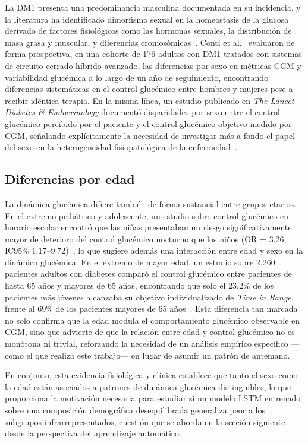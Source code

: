 La DM1 presenta una predominancia masculina documentada en su incidencia, y la literatura ha identificado dimorfismo sexual en la homeostasis de la glucosa derivado de factores fisiológicos como las hormonas sexuales, la distribución de masa grasa y muscular, y diferencias cromosómicas~\cite{mauvaisjarvis2023sexdiff}. Conti et al.~\cite{conti2025sexcgm} evaluaron de forma prospectiva, en una cohorte de 176 adultos con DM1 tratados con sistemas de circuito cerrado híbrido avanzado, las diferencias por sexo en métricas CGM y variabilidad glucémica a lo largo de un año de seguimiento, encontrando diferencias sistemáticas en el control glucémico entre hombres y mujeres pese a recibir idéntica terapia. En la misma línea, un estudio publicado en \emph{The Lancet Diabetes \& Endocrinology} documentó disparidades por sexo entre el control glucémico percibido por el paciente y el control glucémico objetivo medido por CGM, señalando explícitamente la necesidad de investigar más a fondo el papel del sexo en la heterogeneidad fisiopatológica de la enfermedad~\cite{vanderheijden2025sexdisparity}.

\subsection{Diferencias por edad}

La dinámica glucémica difiere también de forma sustancial entre grupos etarios. En el extremo pediátrico y adolescente, un estudio sobre control glucémico en horario escolar encontró que las niñas presentaban un riesgo significativamente mayor de deterioro del control glucémico nocturno que los niños (OR = 3.26, IC95\% 1.17--9.72)~\cite{deng2022schooldays}, lo que sugiere además una interacción entre edad y sexo en la dinámica glucémica. En el extremo de mayor edad, un estudio sobre 2.260 pacientes adultos con diabetes comparó el control glucémico entre pacientes de hasta 65 años y mayores de 65 años, encontrando que solo el 23.2\% de los pacientes más jóvenes alcanzaba su objetivo individualizado de \emph{Time in Range}, frente al 69\% de los pacientes mayores de 65 años~\cite{nwokolo2024agecgm}. Esta diferencia tan marcada no solo confirma que la edad modula el comportamiento glucémico observable en CGM, sino que advierte de que la relación entre edad y control glucémico no es monótona ni trivial, reforzando la necesidad de un análisis empírico específico —como el que realiza este trabajo— en lugar de asumir un patrón de antemano.

En conjunto, esta evidencia fisiológica y clínica establece que tanto el sexo como la edad están asociados a patrones de dinámica glucémica distinguibles, lo que proporciona la motivación necesaria para estudiar si un modelo LSTM entrenado sobre una composición demográfica desequilibrada generaliza peor a los subgrupos infrarrepresentados, cuestión que se aborda en la sección siguiente desde la perspectiva del aprendizaje automático.

